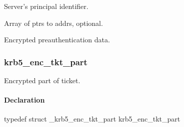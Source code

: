 \documentclass[letterpaper,10pt,english]{sphinxmanual}
\begin{document}

\begin{fulllineitems}
\label{appdev/refs/types/krb5_enc_kdc_rep_part:krb5_enc_kdc_rep_part.server}
Server's principal identifier.

\end{fulllineitems}


\begin{fulllineitems}
\label{appdev/refs/types/krb5_enc_kdc_rep_part:krb5_enc_kdc_rep_part.caddrs}
Array of ptrs to addrs, optional.

\end{fulllineitems}


\begin{fulllineitems}
\label{appdev/refs/types/krb5_enc_kdc_rep_part:krb5_enc_kdc_rep_part.enc_padata}
Encrypted preauthentication data.

\end{fulllineitems}



\subsubsection{krb5\_enc\_tkt\_part}
\label{appdev/refs/types/krb5_enc_tkt_part:krb5-enc-tkt-part}\label{appdev/refs/types/krb5_enc_tkt_part::doc}\label{appdev/refs/types/krb5_enc_tkt_part:krb5-enc-tkt-part-struct}

\begin{fulllineitems}
\label{appdev/refs/types/krb5_enc_tkt_part:krb5_enc_tkt_part}
\end{fulllineitems}


Encrypted part of ticket.


\paragraph{Declaration}
\label{appdev/refs/types/krb5_enc_tkt_part:declaration}
typedef struct \_krb5\_enc\_tkt\_part  krb5\_enc\_tkt\_part
\end{document}
